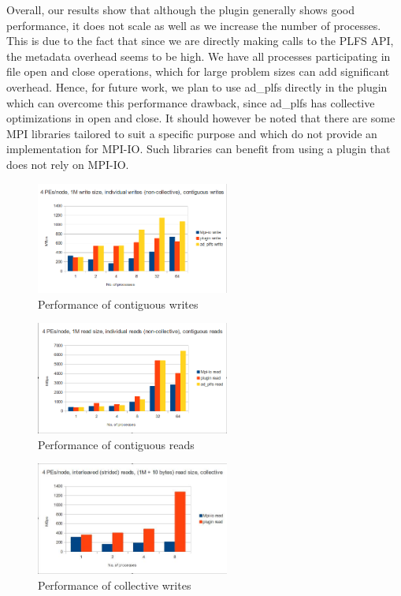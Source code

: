 Overall, our results show that although the plugin generally shows good performance, it does not scale as well as we increase the number of processes. This is due to the fact that since we are directly making calls to the PLFS API, the metadata overhead seems to be high. We have all processes participating in file open and close operations, which for large problem sizes can add significant overhead. Hence, for future work, we plan to use ad\_plfs directly in the plugin which can overcome this performance drawback, since ad\_plfs has collective optimizations in open and close. It should however be noted that there are some MPI libraries tailored to suit a specific purpose and which do not provide an implementation for MPI-IO. Such libraries can benefit from using a plugin that does not rely on MPI-IO. 

\begin{figure}[!t]
\centering
\includegraphics[width=2.5in]{4PEs_node_1M_contig_ind_writes}
\caption{Performance of contiguous writes}
\label{write_contig}
\end{figure}

\begin{figure}[!t]
\centering
\includegraphics[width=2.5in]{4pes_node_1m_ind_read}
\caption{Performance of contiguous reads}
\label{read_contig}
\end{figure}


\begin{figure}[!t]
\centering
\includegraphics[width=2.5in]{4pes_interleaved_1m10_coll_reads}
\caption{Performance of collective writes}
\label{write_collective}
\end{figure}


